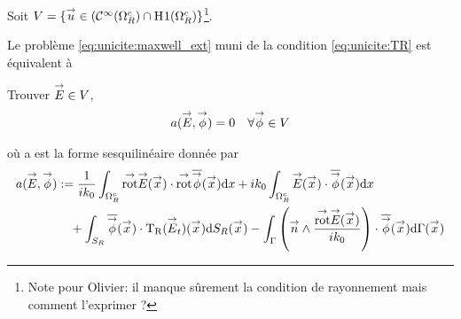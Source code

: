   Soit \(V = \lbrace \vect{u} \in (\mathcal{C}^\infty(\OO^c_R)\cap\Sobolev[1](\OO^c_R) \rbrace\)\footnote{Note pour Olivier: il manque sûrement la condition de rayonnement mais comment l'exprimer ?}.

  Le problème \eqref{eq:unicite:maxwell_ext} muni de la condition \eqref{eq:unicite:TR} est équivalent à
  \begin{prop}
    Trouver \(\vE \in V\),
    \begin{align*}
      a(\vE,\vect\phi) = 0 && \forall \vect \phi \in V
    \end{align*}

    où a est la forme sesquilinéaire donnée par
    \begin{equation*}
      \begin{aligned}
      a(\vE,\vect\phi) &:=  \frac{1}{ik_0} \int_{\OO^c_R} \trot \vE(\vx) \cdot \trot \conj{\vect{\phi}}(\vx) \dd{x} + ik_0\int_{\OO^c_R}\vE(\vx)\cdot\conj{\vect{\phi}}(\vx) \dd{x}
        \\ 
        & \quad + \int_{S_R} \conj{ \vect \phi }(\vx) \cdot \Tr(\vE_t)(\vx) \dd{S_R}(\vx) - \int_\Gamma \left(\vn \pvect \frac{\trot \vE(\vx)}{ik_0}\right) \cdot \conj{\vect \phi} (\vx) \dd{\Gamma}(\vx)
      \end{aligned}
    \end{equation*}
  \end{prop}

